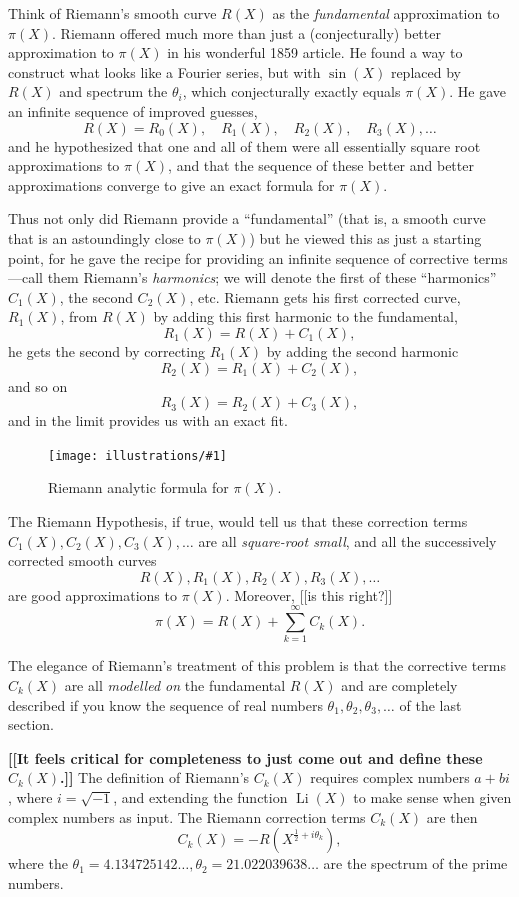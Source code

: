 \documentclass[11pt]{article}
\DeclareMathOperator{\Li}{Li}
\newcommand{\ill}[3]{ 
   \begin{figure}[H]
   \begin{center}
   \texttt{[image: illustrations/\#1]}
   \caption{#3}
   \end{center}
    \end{figure}
}
\theoremstyle{plain}
\theoremstyle{definition}
\numberwithin{equation}{section}
\numberwithin{figure}{section}
\numberwithin{table}{section}
\begin{document}
Think of Riemann's smooth curve $R(X)$ as the {\em fundamental}
approximation to $\pi(X)$.
Riemann offered much more than just a (conjecturally) better 
approximation to $\pi(X)$ in his wonderful 1859 article.  
He found a way to construct what looks like a Fourier series,
but with $\sin(X)$ replaced by $R(X)$ and spectrum the $\theta_i$, which
conjecturally exactly equals $\pi(X)$.
He gave an infinite sequence of improved guesses,
$$
R(X) = R_0(X),\quad R_1(X), \quad R_2(X), \quad R_3(X), \ldots
$$
and he hypothesized that one and all of them were all
essentially square root approximations to $\pi(X)$,
and that the sequence of these better and better approximations converge to give an exact formula
for $\pi(X)$.

Thus not only did Riemann provide a ``fundamental'' (that is, a smooth curve
that is an astoundingly close to $\pi(X)$) but he viewed this as just a
starting point, for he gave the recipe for providing an infinite
sequence of corrective terms---call them Riemann's {\em harmonics}; we
will denote the first of these ``harmonics'' $C_1(X)$, the second
$C_2(X)$, etc.  Riemann gets his first corrected curve, $R_1(X)$, from
$R(X)$ by adding this first harmonic to the fundamental, $$R_1(X) =
R(X) + C_1(X),$$ he gets the second by correcting $R_1(X)$ by adding
the second harmonic $$R_2(X) = R_1 (X) + C_2(X),$$ and so on $$R_3(X)
= R_2 (X) + C_3(X),$$ and in the limit provides us with an exact fit.

\ill{riemann_Rk}{0.8}{Riemann analytic formula for $\pi(X)$.}

The Riemann Hypothesis, if true, would tell us that these correction
terms $C_1(X), C_2(X), C_3(X),\dots$ are all {\em square-root small},
and all the successively corrected smooth curves $$R(X), R_1(X),
R_2(X),R_3(X),\dots$$ are good approximations to $\pi(X)$.
Moreover, [[is this right?]]
$$
 \pi(X) = R(X) + \sum_{k=1}^{\infty} C_k(X).
$$

The elegance of Riemann's treatment of this problem is that the
corrective terms $C_k(X)$ are all {\em modelled on} the fundamental
$R(X)$ and are completely described if you know the sequence of real
numbers $\theta_1, \theta_2, \theta_3,\dots$ of the last section.


{\bf [[It feels critical for completeness to just come out
and define these $C_k(X)$.]]}
The definition of Riemann's $C_k(X)$ requires complex numbers $a+bi$, where $i=\sqrt{-1}$, 
and extending the function $\Li(X)$ to make sense when given complex numbers as input.   
The Riemann correction terms $C_k(X)$ are then
$$
   C_k(X)= -R(X^{\frac{1}{2} + i\theta_k}), 
$$
where the $\theta_1 = 4.134725142\dots, \theta_2 = 21.022039638\dots$
are the spectrum of the prime numbers. 
\end{document}
